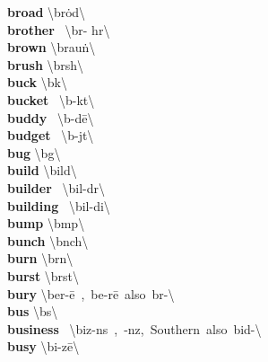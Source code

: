 \documentclass[10pt,a4paper]{article}
\begin{document}
\begin{multicols}{2}
\textbf{ broad }\quad \textbackslash \textprimstress br\.{o}d\textbackslash \\
\textbf{ brother }\quad \ \textbackslash \textprimstress br\textschwa - h\textschwa r\textbackslash \\
\textbf{ brown }\quad \textbackslash \textprimstress brau\. n\textbackslash \\
\textbf{ brush }\quad \textbackslash \textprimstress br\textschwa sh\textbackslash \\
\textbf{ buck }\quad \textbackslash \textprimstress b\textschwa k\textbackslash \\
\textbf{ bucket }\quad \ \textbackslash \textprimstress b\textschwa -k\textschwa t\textbackslash \\
\textbf{ buddy }\quad \ \textbackslash \textprimstress b\textschwa -d\={e}\textbackslash \\
\textbf{ budget }\quad \ \textbackslash \textprimstress b\textschwa -j\textschwa t\textbackslash \\
\textbf{ bug }\quad \textbackslash \textprimstress b\textschwa g\textbackslash \\
\textbf{ build }\quad \textbackslash \textprimstress bild\textbackslash \\
\textbf{ builder }\quad \ \textbackslash \textprimstress bil-d\textschwa r\textbackslash \\
\textbf{ building }\quad \ \textbackslash \textprimstress bil-di\engma \textbackslash \\
\textbf{ bump }\quad \textbackslash \textprimstress b\textschwa mp\textbackslash \\
\textbf{ bunch }\quad \textbackslash \textprimstress b\textschwa nch\textbackslash \\
\textbf{ burn }\quad \textbackslash \textprimstress b\textschwa rn\textbackslash \\
\textbf{ burst }\quad \textbackslash \textprimstress b\textschwa rst\textbackslash \\
\textbf{ bury }\quad \textbackslash \textprimstress ber-\={e}\ ,\ \textprimstress be-r\={e}\ also\ \textprimstress b\textschwa r-\textbackslash \\
\textbf{ bus }\quad \textbackslash \textprimstress b\textschwa s\textbackslash \\
\textbf{ business }\quad \ \textbackslash \textprimstress biz-n\textschwa s\ ,\ -n\textschwa z,\ Southern\ also\ \textprimstress bid-\textbackslash \\
\textbf{ busy }\quad \textbackslash \textprimstress bi-z\={e}\textbackslash \\

\end{multicols}
\end{document}
